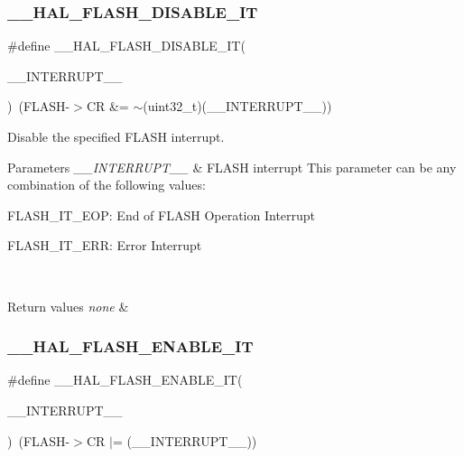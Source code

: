 \subsubsection{\texorpdfstring{\+\_\+\+\_\+\+H\+A\+L\+\_\+\+F\+L\+A\+S\+H\+\_\+\+D\+I\+S\+A\+B\+L\+E\+\_\+\+IT}{\_\_HAL\_FLASH\_DISABLE\_IT}}
{\footnotesize\ttfamily \#define \+\_\+\+\_\+\+H\+A\+L\+\_\+\+F\+L\+A\+S\+H\+\_\+\+D\+I\+S\+A\+B\+L\+E\+\_\+\+IT(\begin{DoxyParamCaption}\item[{}]{\+\_\+\+\_\+\+I\+N\+T\+E\+R\+R\+U\+P\+T\+\_\+\+\_\+ }\end{DoxyParamCaption})~(F\+L\+A\+SH-\/$>$CR \&= $\sim$(uint32\+\_\+t)(\+\_\+\+\_\+\+I\+N\+T\+E\+R\+R\+U\+P\+T\+\_\+\+\_\+))}



Disable the specified F\+L\+A\+SH interrupt. 


\begin{DoxyParams}{Parameters}
{\em \+\_\+\+\_\+\+I\+N\+T\+E\+R\+R\+U\+P\+T\+\_\+\+\_\+} & F\+L\+A\+SH interrupt This parameter can be any combination of the following values\+: \begin{DoxyItemize}
\item F\+L\+A\+S\+H\+\_\+\+I\+T\+\_\+\+E\+OP\+: End of F\+L\+A\+SH Operation Interrupt \item F\+L\+A\+S\+H\+\_\+\+I\+T\+\_\+\+E\+RR\+: Error Interrupt ~\newline
\end{DoxyItemize}
\\
\hline
\end{DoxyParams}

\begin{DoxyRetVals}{Return values}
{\em none} & \\
\hline
\end{DoxyRetVals}
\mbox{\label{group___f_l_a_s_h___exported___macros_ga13fa137a911f02a2f94fb9fb0762a340}} 
\subsubsection{\texorpdfstring{\+\_\+\+\_\+\+H\+A\+L\+\_\+\+F\+L\+A\+S\+H\+\_\+\+E\+N\+A\+B\+L\+E\+\_\+\+IT}{\_\_HAL\_FLASH\_ENABLE\_IT}}
{\footnotesize\ttfamily \#define \+\_\+\+\_\+\+H\+A\+L\+\_\+\+F\+L\+A\+S\+H\+\_\+\+E\+N\+A\+B\+L\+E\+\_\+\+IT(\begin{DoxyParamCaption}\item[{}]{\+\_\+\+\_\+\+I\+N\+T\+E\+R\+R\+U\+P\+T\+\_\+\+\_\+ }\end{DoxyParamCaption})~(F\+L\+A\+SH-\/$>$CR $\vert$= (\+\_\+\+\_\+\+I\+N\+T\+E\+R\+R\+U\+P\+T\+\_\+\+\_\+))}



